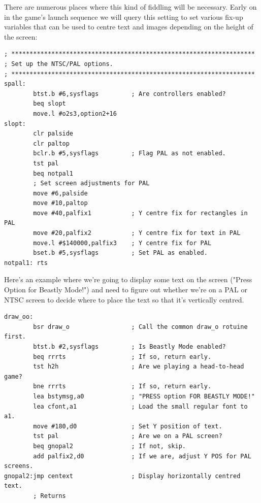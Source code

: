 There are numerous places where this kind of fiddling will be necessary. Early on in the
game's launch sequence we will query this  setting to set various fix-up
variables that can be used to centre text and images depending on the height of the
screen:

\begin{lstlisting}
; *******************************************************************
; Set up the NTSC/PAL options.
; *******************************************************************
spall:
        btst.b #6,sysflags         ; Are controllers enabled?
        beq slopt
        move.l #o2s3,option2+16
slopt:
        clr palside
        clr paltop
        bclr.b #5,sysflags         ; Flag PAL as not enabled.
        tst pal
        beq notpal1
        ; Set screen adjustments for PAL
        move #6,palside
        move #10,paltop
        move #40,palfix1           ; Y centre fix for rectangles in PAL
        move #20,palfix2           ; Y centre fix for text in PAL
        move.l #$140000,palfix3    ; Y centre fix for PAL
        bset.b #5,sysflags         ; Set PAL as enabled.
notpal1: rts
\end{lstlisting}

Here's an example where we're going to display some text on the screen
("Press Option for Beastly Mode!") and need to figure out whether we're on
a PAL or NTSC screen to decide where to place the text so that it's vertically
centred.
\begin{lstlisting}
draw_oo:
        bsr draw_o                 ; Call the common draw_o rotuine first.
        btst.b #2,sysflags         ; Is Beastly Mode enabled?
        beq rrrts                  ; If so, return early.
        tst h2h                    ; Are we playing a head-to-head game?
        bne rrrts                  ; If so, return early.
        lea bstymsg,a0             ; "PRESS option FOR BEASTLY MODE!"
        lea cfont,a1               ; Load the small regular font to a1.
        move #180,d0               ; Set Y position of text.
        tst pal                    ; Are we on a PAL screen?
        beq gnopal2                ; If not, skip.
        add palfix2,d0             ; If we are, adjust Y POS for PAL screens.
gnopal2:jmp centext                ; Display horizontally centred text.
        ; Returns
\end{lstlisting}

